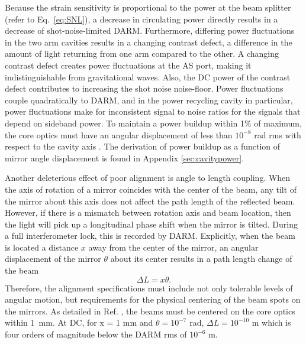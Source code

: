 Because the strain sensitivity is proportional to the power at the beam splitter (refer to Eq.~\ref{eq:SNL}), a decrease in circulating power directly results in a decrease of shot-noise-limited DARM. Furthermore, differing power fluctuations in the two arm cavities results in a changing contrast defect, a difference in the amount of light returning from one arm compared to the other. A changing contrast defect creates power fluctuations at the AS port, making it indistinguishable from gravitational waves. Also, the DC power of the contrast defect contributes to increasing the shot noise noise-floor. Power fluctuations couple quadratically to DARM, and in the power recycling cavity in particular, power fluctuations make for inconsistent signal to noise ratios for the signals that depend on sideband power. To maintain a power buildup within 1\% of maximum, the core optics must have an angular displacement of less than $10^{-8}$ rad rms with respect to the cavity axis \cite{ISCGroup1998ASC}. The derivation of power buildup as a function of mirror angle displacement is found in Appendix \ref{sec:cavitypower}.

Another deleterious effect of poor alignment is angle to length coupling. 
When the axis of rotation of a mirror coincides with
the center of the beam, any tilt of the mirror about this axis does
not affect the path length of the reflected beam. However, if there is
a mismatch between rotation axis and beam location, then the light
will pick up a longitudinal phase shift when the mirror is
tilted. During a full interferometer lock, this is recorded by DARM. Explicitly, when the beam is located a distance $x$ away from the center of the mirror, an
angular displacement of the mirror $\theta$ about its center results in a path
length change of the beam
\begin{equation}
\Delta{L} = x \theta.
\end{equation}
Therefore, the alignment specifications must include not only tolerable levels of angular motion, but requirements for the physical centering of the beam spots on the mirrors. As detailed in Ref. \cite{ISCGroup1998ASC}, the beams must be centered on the core optics within 1~mm. At DC, for x = 1 mm and $\theta = 10^{-7}$ rad, $\Delta{L} = 10^{-10}$ m which is four orders of magnitude below the DARM rms of $10^{-6}$ m.




